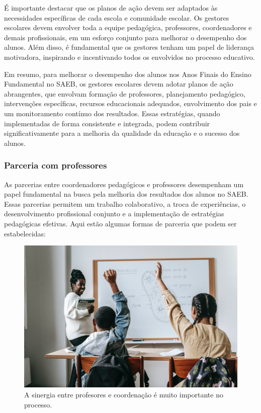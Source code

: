 É importante destacar que os planos de ação devem ser adaptados às
necessidades específicas de cada escola e comunidade escolar. Os
gestores escolares devem envolver toda a equipe pedagógica, professores,
coordenadores e demais profissionais, em um esforço conjunto para
melhorar o desempenho dos alunos. Além disso, é fundamental que os
gestores tenham um papel de liderança motivadora, inspirando e
incentivando todos os envolvidos no processo educativo.

Em resumo, para melhorar o desempenho dos alunos nos Anos Finais do
Ensino Fundamental no SAEB, os gestores escolares devem adotar planos de
ação abrangentes, que envolvam formação de professores, planejamento
pedagógico, intervenções específicas, recursos educacionais adequados,
envolvimento dos pais e um monitoramento contínuo dos resultados. Essas
estratégias, quando implementadas de forma consistente e integrada,
podem contribuir significativamente para a melhoria da qualidade da
educação e o sucesso dos alunos.

\subsubsection{Parceria com
professores}\label{parceria-com-professores}

As parcerias entre coordenadores pedagógicos e professores desempenham
um papel fundamental na busca pela melhoria dos resultados dos alunos no
SAEB. Essas parcerias permitem um trabalho colaborativo, a troca de
experiências, o desenvolvimento profissional conjunto e a implementação
de estratégias pedagógicas efetivas. Aqui estão algumas formas de
parceria que podem ser estabelecidas:

\begin{figure}[t]
\centering
\includegraphics[width=\textwidth]{./imgs/Imagem007.jpg}
\caption{A sinergia entre profesores e coordenação é muito importante no
processo.}
\end{figure}

